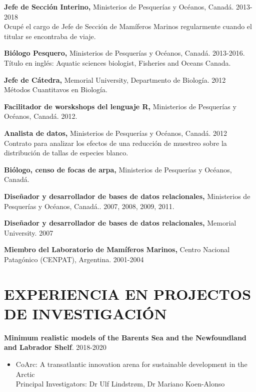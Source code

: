 \documentclass{res}
\begin{document}
\begin{resume}
\textbf{Jefe de Secci\'on Interino,} Ministerios de Pesquer\'ias y Oc\'eanos, Canad\'a. 2013-2018\\ Ocup\'e el cargo de Jefe de Secci\'on de Mam\'iferos Marinos regularmente cuando el titular se encontraba de viaje.

\textbf{Bi\'ologo Pesquero,} Ministerios de Pesquer\'ias y Oc\'eanos, Canad\'a. 2013-2016. T\'{i}tulo en ingl\'es: Aquatic sciences biologist, Fisheries and Oceans Canada.

\textbf{Jefe de C\'atedra,} Memorial University, Departmento de Biolog\'ia. 2012 \\ M\'etodos Cuantitavos en Biolog\'ia.  

\textbf{Facilitador de worskshops del lenguaje R,} Ministerios de Pesquer\'ias y Oc\'eanos, Canad\'a. 2012.

\textbf{Analista de datos,}  Ministerios de Pesquer\'ias y Oc\'eanos, Canad\'a. 2012\\
Contrato para analizar los efectos de una reducci\'on de muestreo sobre la distribuci\'on de tallas de especies blanco.

\textbf{Bi\'ologo, censo de focas de arpa,} Ministerios de Pesquer\'ias y Oc\'eanos, Canad\'a. 

\textbf{Dise\~{n}ador y desarrollador de bases de datos relacionales,} Ministerios de Pesquer\'ias y Oc\'eanos, Canad\'a.. 2007, 2008, 2009, 2011.

\textbf{Dise\~{n}ador y desarrollador de bases de datos relacionales,} Memorial University. 2007

\textbf{Miembro del Laboratorio de Mam\'iferos Marinos,} Centro Nacional Patag\'{o}nico (CENPAT), Argentina. 2001-2004
 
 \pagebreak
 
\section{EXPERIENCIA EN PROJECTOS DE INVESTIGACI\'ON}


{\bf Minimum realistic models of the Barents Sea and the Newfoundland and Labrador Shelf}. 2018-2020
\begin{itemize} %
	\item[] CoArc: A transatlantic innovation arena for sustainable development in the Arctic\\
	Principal Investigators: Dr Ulf Lindstr{\o}m, Dr Mariano Koen-Alonso
\end{itemize}


\end{resume}
\end{document}
